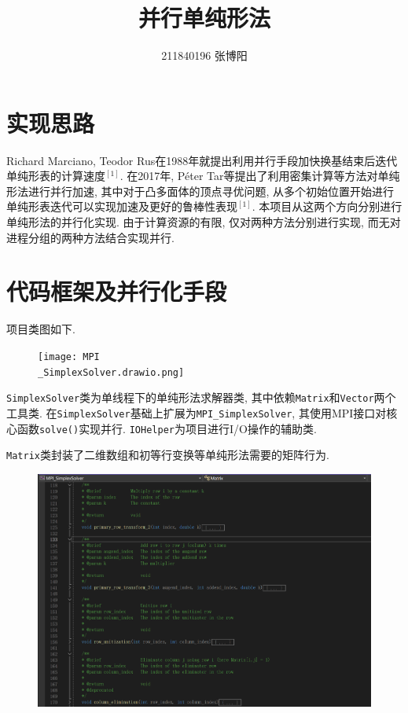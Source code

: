 \documentclass[UTF8,a4paper,10pt]{ctexart}
\title{\textbf{并行单纯形法}}
\author{ 211840196 张博阳 }
\date{}
\begin{document}
\maketitle
\section{实现思路}
Richard Marciano, Teodor Rus在1988年就提出利用并行手段加快换基结束后迭代单纯形表的计算速度$^{[1]}$. 在2017年,  Péter Tar等提出了利用密集计算等方法对单纯形法进行并行加速, 其中对于凸多面体的顶点寻优问题, 从多个初始位置开始进行单纯形表迭代可以实现加速及更好的鲁棒性表现$^{[1]}$. 本项目从这两个方向分别进行单纯形法的并行化实现. 由于计算资源的有限, 仅对两种方法分别进行实现, 而无对进程分组的两种方法结合实现并行.
\section{代码框架及并行化手段}
项目类图如下.
\begin{figure}[htbp]
    \centering
    \texttt{[image: MPI\\\_SimplexSolver.drawio.png]}
\end{figure}
\texttt{SimplexSolver}类为单线程下的单纯形法求解器类, 其中依赖\texttt{Matrix}和\texttt{Vector}两个工具类. 在\texttt{SimplexSolver}基础上扩展为\texttt{MPI\_SimplexSolver}, 其使用MPI接口对核心函数\texttt{solve()}实现并行. \texttt{IOHelper}为项目进行I/O操作的辅助类.
\par
\texttt{Matrix}类封装了二维数组和初等行变换等单纯形法需要的矩阵行为.
\begin{figure}[htbp]
    \centering
    \includegraphics[width=14cm]{Matrix.png}
\end{figure}
\end{document}
